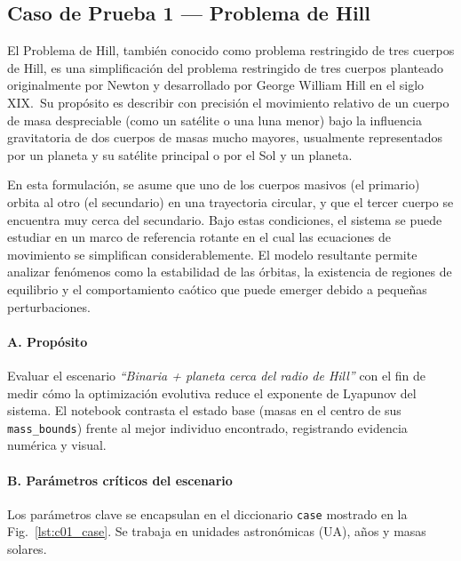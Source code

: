 \subsection{Caso de Prueba 1 — Problema de Hill}

El Problema de Hill, también conocido como problema restringido de tres cuerpos de Hill, es una simplificación del problema restringido de tres cuerpos planteado originalmente por Newton y desarrollado por George William Hill en el siglo XIX.\ Su propósito es describir con precisión el movimiento relativo de un cuerpo de masa despreciable (como un satélite o una luna menor) bajo la influencia gravitatoria de dos cuerpos de masas mucho mayores, usualmente representados por un planeta y su satélite principal o por el Sol y un planeta.\

En esta formulación, se asume que uno de los cuerpos masivos (el primario) orbita al otro (el secundario) en una trayectoria circular, y que el tercer cuerpo se encuentra muy cerca del secundario. Bajo estas condiciones, el sistema se puede estudiar en un marco de referencia rotante en el cual las ecuaciones de movimiento se simplifican considerablemente. El modelo resultante permite analizar fenómenos como la estabilidad de las órbitas, la existencia de regiones de equilibrio y el comportamiento caótico que puede emerger debido a pequeñas perturbaciones.
\paragraph{A. Propósito}
Evaluar el escenario \emph{“Binaria + planeta cerca del radio de Hill”} con el fin de medir cómo la optimización evolutiva reduce el exponente de Lyapunov del sistema. El notebook contrasta el estado base (masas en el centro de sus \texttt{mass\_bounds}) frente al mejor individuo encontrado, registrando evidencia numérica y visual.

\paragraph{B. Parámetros críticos del escenario}
Los parámetros clave se encapsulan en el diccionario \texttt{case} mostrado en la Fig.~\ref{lst:c01_case}. Se trabaja en unidades astronómicas (UA), años y masas solares.

